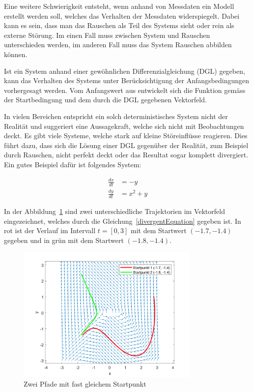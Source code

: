 Eine weitere Schwierigkeit entsteht, wenn anhand von Messdaten ein Modell erstellt werden soll, welches das Verhalten der Messdaten widerspiegelt. Dabei kann es sein, dass man das Rauschen als Teil des Systems sieht oder rein als externe Störung. Im einen Fall muss zwischen System und Rauschen unterschieden werden, im anderen Fall muss das System Rauschen abbilden können.

Ist ein System anhand einer gewöhnlichen Differenzialgleichung (DGL) gegeben, kann das Verhalten des Systems unter Berücksichtigung der Anfangsbedingungen vorhergesagt werden. Vom Anfangswert aus entwickelt sich die Funktion gemäss der Startbedingung und dem durch die DGL gegebenen Vektorfeld. 

In vielen Bereichen entspricht ein solch deterministisches System  nicht der Realität und suggeriert eine Aussagekraft, welche sich nicht mit Beobachtungen deckt. Es gibt viele Systeme, welche stark auf kleine Störeinflüsse reagieren. Dies führt dazu, dass sich die Lösung einer DGL gegenüber der Realität, zum Beispiel durch Rauschen, nicht perfekt deckt oder das Resultat sogar komplett divergiert. Ein gutes Beispiel dafür ist folgendes System:

\begin{align}
	\frac{dx}{dt} &= -y \\
	\frac{dy}{dt} &= x^2 + y
	\label{divergentEquation}
\end{align}


In der Abbildung~\ref{divergentAndConvergentSystem} sind zwei unterschiedliche Trajektorien im Vektorfeld eingezeichnet, welches durch die Gleichung~\ref{divergentEquation} gegeben ist. In rot ist der Verlauf im Intervall  $ t = [0, 3] $ mit dem Startwert $ (-1.7, -1.4) $ gegeben und in grün mit dem Startwert $ (-1.8, -1.4) $.

\begin{figure}
	\centering
	\includegraphics[width=0.8\textwidth]{papers/brown/images/Vektorfeld-mit-zwei-Pfaden.png}
	\caption{Zwei Pfade mit fast gleichem Startpunkt}
	\label{divergentAndConvergentSystem}
\end{figure}

